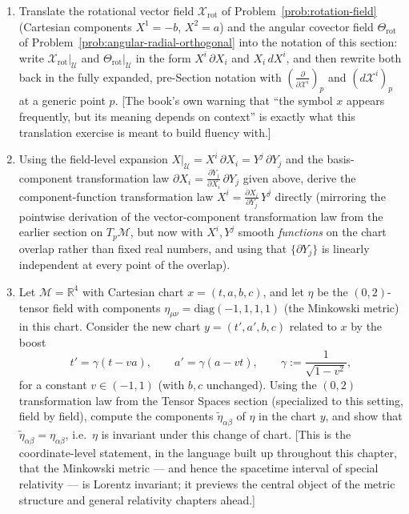 \documentclass[11pt]{article}
\begin{document}
\begin{enumerate}[label=\textbf{5.\arabic*}, leftmargin=2.2cm, start=12]

\item \label{prob:notation-translation}
Translate the rotational vector field $\mathcal X_{\mathrm{rot}}$ of
Problem~\ref{prob:rotation-field} (Cartesian components $X^1=-b$, $X^2=a$)
and the angular covector field $\Theta_{\mathrm{rot}}$ of
Problem~\ref{prob:angular-radial-orthogonal} into the notation of this
section: write $\mathcal X_{\mathrm{rot}}|_{\mathcal U}$ and
$\Theta_{\mathrm{rot}}|_{\mathcal U}$ in the form $X^i\,\partial X_i$ and
$X_i\,dX^i$, and then rewrite both back in the fully expanded, pre-Section
notation with $\left(\frac{\partial}{\partial\mathcal X^i}\right)_p$ and
$(d\mathcal X^i)_p$ at a generic point $p$. [The book's own warning that
``the symbol $x$ appears frequently, but its meaning depends on context''
is exactly what this translation exercise is meant to build fluency with.]

\item \label{prob:field-level-transformation-derivation}
Using the field-level expansion $X|_{\mathcal U}=X^i\,\partial X_i=Y^j
\,\partial Y_j$ and the basis-component transformation law
$\partial X_i=\frac{\partial Y_j}{\partial X_i}\,\partial Y_j$ given above,
derive the component-function transformation law
$X^i=\frac{\partial X_i}{\partial Y_j}\,Y^j$ directly (mirroring the
pointwise derivation of the vector-component transformation law from the
earlier section on $T_p\mathcal M$, but now with $X^i,Y^j$ smooth
\emph{functions} on the chart overlap rather than fixed real numbers, and
using that $\{\partial Y_j\}$ is linearly independent at every point of
the overlap).

\item \label{prob:minkowski-boost}
Let $\mathcal M=\mathbb R^4$ with Cartesian chart $x=(t,a,b,c)$, and let
$\eta$ be the $(0,2)$-tensor field with components
$\eta_{\mu\nu}=\mathrm{diag}(-1,1,1,1)$ (the Minkowski metric) in this
chart. Consider the new chart $y=(t',a',b,c)$ related to $x$ by the boost
\[
t'=\gamma(t-va),\qquad a'=\gamma(a-vt),\qquad \gamma:=\frac{1}{\sqrt{1-v^2}},
\]
for a constant $v\in(-1,1)$ (with $b,c$ unchanged). Using the $(0,2)$
transformation law from the Tensor Spaces section (specialized to this
setting, field by field), compute the components $\widetilde
\eta_{\alpha\beta}$ of $\eta$ in the chart $y$, and show that
$\widetilde\eta_{\alpha\beta}=\eta_{\alpha\beta}$, i.e.\ $\eta$ is
invariant under this change of chart. [This is the coordinate-level
statement, in the language built up throughout this chapter, that the
Minkowski metric --- and hence the spacetime interval of special
relativity --- is Lorentz invariant; it previews the central object of the
metric structure and general relativity chapters ahead.]

\end{enumerate}
\end{document}
